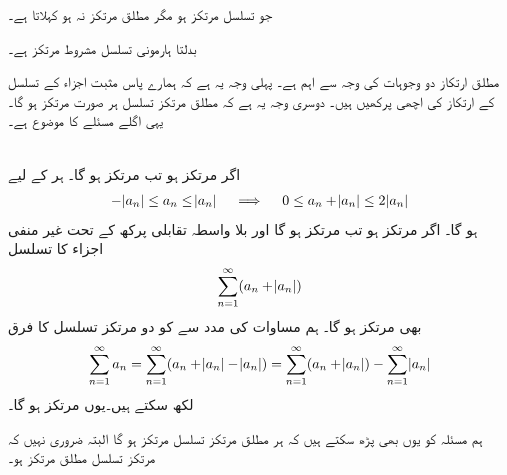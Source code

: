 جو تسلسل مرتکز ہو مگر مطلق مرتکز نہ ہو  کہلاتا ہے۔

بدلتا ہارمونی تسلسل مشروط مرتکز ہے۔

مطلق ارتکاز دو وجوہات کی وجہ سے اہم ہے۔ پہلی وجہ یہ ہے کہ ہمارے پاس مثبت اجزاء کے تسلسل کے ارتکاز کی اچھی پرکھیں  ہیں۔ دوسری وجہ یہ ہے  کہ مطلق مرتکز تسلسل ہر صورت مرتکز ہو گا۔ یہی اگلے مسئلے کا موضوع ہے۔

\\
اگر  مرتکز ہو تب  مرتکز ہو گا۔
ہر  کے لیے
\begin{align*}
-\abs{a_n}\le a_n\le \abs{a_n}\quad \implies \quad 0\le a_n+\abs{a_n}\le 2\abs{a_n}
\end{align*}
ہو گا۔ اگر  مرتکز ہو تب  مرتکز ہو گا اور بلا واسطہ تقابلی پرکھ کے تحت  غیر منفی  اجزاء کا تسلسل 
\begin{align*}
\sum_{n=1}^{\infty}(a_n+\abs{a_n})
\end{align*}
بھی مرتکز ہو گا۔ ہم مساوات  کی مدد سے   کو دو مرتکز تسلسل کا فرق 
\begin{align*}
\sum_{n=1}^{\infty}a_n=\sum_{n=1}^{\infty}(a_n+\abs{a_n}-\abs{a_n})=\sum_{n=1}^{\infty}(a_n+\abs{a_n})-\sum_{n=1}^{\infty}\abs{a_n}
\end{align*}
لکھ سکتے ہیں۔یوں  مرتکز ہو گا۔

ہم مسئلہ  کو یوں بھی پڑھ سکتے ہیں کہ ہر مطلق مرتکز تسلسل مرتکز ہو گا البتہ ضروری نہیں  کہ مرتکز تسلسل مطلق مرتکز ہو۔

